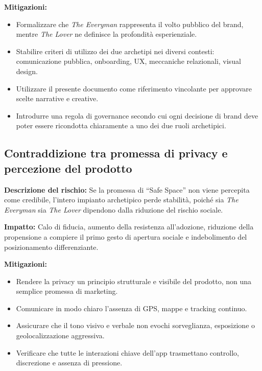 \documentclass[a4paper, 11pt, table, dvipsnames]{article}
\begin{document}
\textbf{Mitigazioni:}
\begin{itemize}
      \item Formalizzare che \textit{The Everyman} rappresenta
            il volto pubblico del brand, mentre \textit{The Lover}
            ne definisce la profondità esperienziale.

      \item Stabilire criteri di utilizzo dei due archetipi nei
            diversi contesti: comunicazione pubblica, onboarding,
            UX, meccaniche relazionali, visual design.

      \item Utilizzare il presente documento come riferimento vincolante
            per approvare scelte narrative e creative.

      \item Introdurre una regola di governance secondo cui ogni
            decisione di brand deve poter essere ricondotta chiaramente
            a uno dei due ruoli archetipici.
\end{itemize}

\subsection{Contraddizione tra promessa di privacy e
      percezione del prodotto}

\textbf{Descrizione del rischio:} Se la promessa di \enquote{Safe Space}
non viene percepita come credibile, l'intero impianto archetipico
perde stabilità, poiché sia \textit{The Everyman} sia \textit{The
      Lover} dipendono dalla riduzione del rischio sociale.

\textbf{Impatto:} Calo di fiducia, aumento della
resistenza all'adozione, riduzione della propensione a compiere
il primo gesto di apertura sociale e indebolimento del posizionamento
differenziante.

\textbf{Mitigazioni:}
\begin{itemize}
      \item Rendere la privacy un principio strutturale e visibile
            del prodotto, non una semplice promessa di marketing.

      \item Comunicare in modo chiaro l'assenza di GPS, mappe
            e tracking continuo.

      \item Assicurare che il tono visivo e verbale non evochi
            sorveglianza, esposizione o geolocalizzazione
            aggressiva.

      \item Verificare che tutte le interazioni chiave dell'app
            trasmettano controllo, discrezione e assenza di
            pressione.
\end{itemize}
\end{document}
